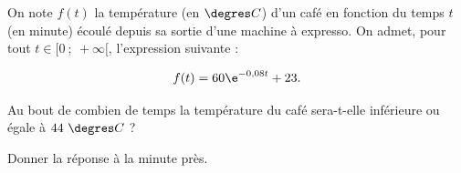 \medskip

On note $f(t)$ la température (en $\degres C$) d'un café en fonction du temps $t$ (en minute) écoulé depuis sa sortie d'une machine à expresso. On admet, pour tout $t \in [0~;~ +\infty[$, l'expression suivante :

\[f(t) = 60\e^{- 0,08t} + 23.\]

Au bout de combien de temps la température du café sera-t-elle inférieure ou égale à $44~\degres C$ ?

Donner la réponse à la minute près.
